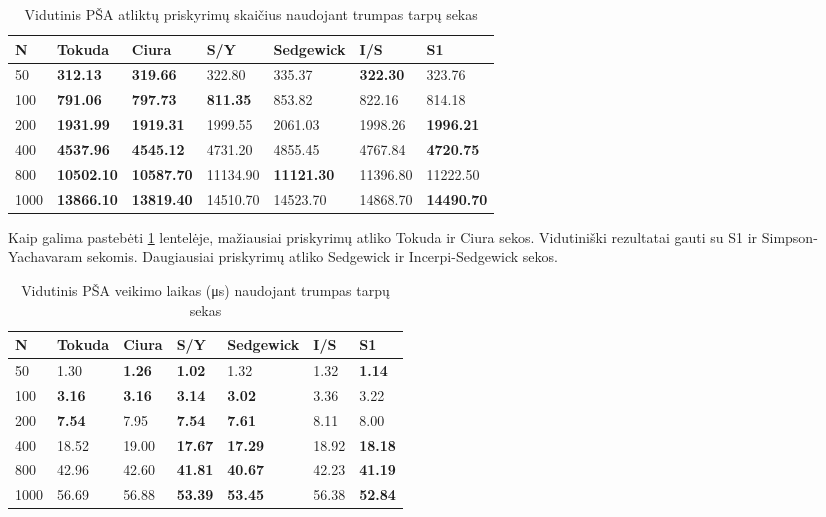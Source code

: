 \documentclass{VUMIFInfKursinis}
\begin{document}
\begin{table}[H]
  \caption{Vidutinis PŠA atliktų priskyrimų skaičius naudojant trumpas tarpų sekas}
  \label{iss_small_assignments}
  \begin{tabular}{|l|l|l|l|l|l|l|}
  \hline
  N    & Tokuda            & Ciura             & S/Y             & Sedgewick         & I/S             & S1                \\ \hline
  50   & \textbf{312.13}   & \textbf{319.66}   & 322.80          & 335.37            & \textbf{322.30} & 323.76            \\ \hline
  100  & \textbf{791.06}   & \textbf{797.73}   & \textbf{811.35} & 853.82            & 822.16          & 814.18            \\ \hline
  200  & \textbf{1931.99}  & \textbf{1919.31}  & 1999.55         & 2061.03           & 1998.26         & \textbf{1996.21}  \\ \hline
  400  & \textbf{4537.96}  & \textbf{4545.12}  & 4731.20         & 4855.45           & 4767.84         & \textbf{4720.75}  \\ \hline
  800  & \textbf{10502.10} & \textbf{10587.70} & 11134.90        & \textbf{11121.30} & 11396.80        & 11222.50          \\ \hline
  1000 & \textbf{13866.10} & \textbf{13819.40} & 14510.70        & 14523.70          & 14868.70        & \textbf{14490.70} \\ \hline
  \end{tabular}
\end{table}

Kaip galima pastebėti \ref{iss_small_assignments} lentelėje, mažiausiai priskyrimų atliko Tokuda ir Ciura sekos.
Vidutiniški rezultatai gauti su S1 ir Simpson-Yachavaram sekomis.
Daugiausiai priskyrimų atliko Sedgewick ir Incerpi-Sedgewick sekos.

\begin{table}[H]
  \caption{Vidutinis PŠA veikimo laikas (μs) naudojant trumpas tarpų sekas}
  \label{iss_small_runtimes}
  \begin{tabular}{|l|l|l|l|l|l|l|}
  \hline
  N    & Tokuda        & Ciura         & S/Y            & Sedgewick      & I/S   & S1             \\ \hline
  50   & 1.30          & \textbf{1.26} & \textbf{1.02}  & 1.32           & 1.32  & \textbf{1.14}  \\ \hline
  100  & \textbf{3.16} & \textbf{3.16} & \textbf{3.14}  & \textbf{3.02}  & 3.36  & 3.22           \\ \hline
  200  & \textbf{7.54} & 7.95          & \textbf{7.54}  & \textbf{7.61}  & 8.11  & 8.00           \\ \hline
  400  & 18.52         & 19.00         & \textbf{17.67} & \textbf{17.29} & 18.92 & \textbf{18.18} \\ \hline
  800  & 42.96         & 42.60         & \textbf{41.81} & \textbf{40.67} & 42.23 & \textbf{41.19} \\ \hline
  1000 & 56.69         & 56.88         & \textbf{53.39} & \textbf{53.45} & 56.38 & \textbf{52.84} \\ \hline
  \end{tabular}
\end{table}
\end{document}
